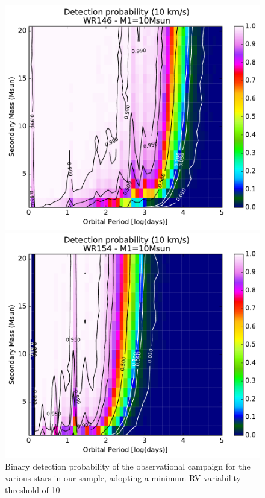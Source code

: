 \begin{figure}[h!]
\begin{minipage}{0.49\textwidth}
    \end{minipage}
    \begin{minipage}{0.49\textwidth}
    \centering
    \includegraphics[width=\textwidth]{chapters/appendix3/image/146PM2_thres10_MAR31.pdf}
    \end{minipage}
    \begin{minipage}{0.49\textwidth}
    \centering
    \includegraphics[width=\textwidth]{chapters/appendix3/image/154PM2_thres10_MAR31.pdf}
    \end{minipage}
    \caption{Binary detection probability of the observational campaign for the various stars in our sample, adopting a minimum RV variability threshold of 10~\kms}
    \label{f:Pdetect2}
\end{figure}

 
